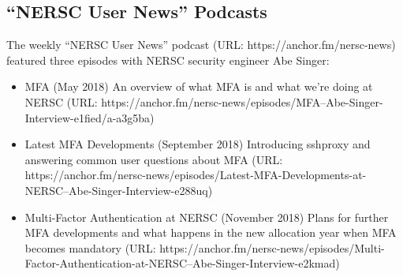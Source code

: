 \documentclass[sigconf,review]{acmart}
\begin{document}
\subsection{``NERSC User News'' Podcasts}

The weekly ``NERSC User News'' podcast (URL: https://anchor.fm/nersc-news) featured three episodes with NERSC security engineer Abe Singer:
\begin{itemize}
\item  MFA (May 2018) An overview of what MFA is and what we're doing at NERSC (URL: https://anchor.fm/nersc-news/episodes/MFA--Abe-Singer-Interview-e1fied/a-a3g5ba)
\item  Latest MFA Developments (September 2018) Introducing sshproxy and answering common user questions about MFA (URL: https://anchor.fm/nersc-news/episodes/Latest-MFA-Developments-at-NERSC--Abe-Singer-Interview-e288uq)
\item  Multi-Factor Authentication at NERSC (November 2018) Plans for further MFA developments and what happens in the new allocation year when MFA becomes mandatory (URL: https://anchor.fm/nersc-news/episodes/Multi-Factor-Authentication-at-NERSC--Abe-Singer-Interview-e2kmad)
\end{itemize}
\end{document}
